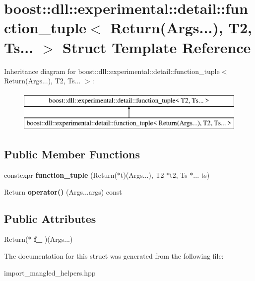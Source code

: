 \hypertarget{a01468}{}\section{boost\+:\+:dll\+:\+:experimental\+:\+:detail\+:\+:function\+\_\+tuple$<$ Return(Args...), T2, Ts... $>$ Struct Template Reference}
\label{a01468}
Inheritance diagram for boost\+:\+:dll\+:\+:experimental\+:\+:detail\+:\+:function\+\_\+tuple$<$ Return(Args...), T2, Ts... $>$\+:\begin{figure}[H]
\begin{center}
\leavevmode
\includegraphics[height=2.000000cm]{a01468}
\end{center}
\end{figure}
\subsection*{Public Member Functions}
\begin{DoxyCompactItemize}
\item 
\mbox{\label{a01468_a6afcd4f7aee21e0bceb780d950dc450d}} 
constexpr {\bfseries function\+\_\+tuple} (Return($\ast$t)(Args...), T2 $\ast$t2, Ts $\ast$... ts)
\item 
\mbox{\label{a01468_a7c7a12b0e9db6f25edead61adafbfd6e}} 
Return {\bfseries operator()} (Args...\+args) const
\end{DoxyCompactItemize}
\subsection*{Public Attributes}
\begin{DoxyCompactItemize}
\item 
\mbox{\label{a01468_a3e05c0f04b51b4e787d64836bd179278}} 
Return($\ast$ {\bfseries f\+\_\+} )(Args...)
\end{DoxyCompactItemize}


The documentation for this struct was generated from the following file\+:\begin{DoxyCompactItemize}
\item 
import\+\_\+mangled\+\_\+helpers.\+hpp\end{DoxyCompactItemize}
